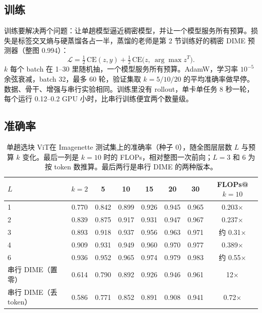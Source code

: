 \documentclass[11pt,a4paper,UTF8,fontset=none]{ctexart}
\newcommand{\dense}{整图一次前向}
\newcommand{\tokdrop}{丢 token}
\newcommand{\onepass}{单趟选块 ViT}
\begin{document}
\subsection{训练}

训练要解决两个问题：让单趟模型逼近稠密模型，并让一个模型服务所有预算。损失是标签交叉熵与硬蒸馏各占一半，蒸馏的老师是第 2 节训练好的稠密 DIME 预测器（整图 0.994）：
\begin{equation}
\mathcal{L} = \tfrac12\,\mathrm{CE}(z, y) + \tfrac12\,\mathrm{CE}\big(z,\ \arg\max z^{T}\big).
\end{equation}
$k$ 每个 batch 在 1--30 里随机抽，一个模型服务所有预算。AdamW，学习率 $10^{-5}$ 余弦衰减，batch 32，最多 60 轮，验证集取 $k=5/10/20$ 的平均准确率做早停。数据、骨干、增强与串行实验相同。训练里没有 rollout，单卡单任务 8 秒一轮，每个运行 0.12--0.2 GPU 小时，比串行训练便宜两个数量级。

\subsection{准确率}

\begin{table}[H]
\centering
\caption{\onepass{}在 Imagenette 测试集上的准确率（种子 0），随全图层层数 $L$ 与预算 $k$ 变化。最后一列是 $k=10$ 时的 FLOPs，相对\dense；$L=3$ 和 6 为按 token 数推算。最后两行是串行 DIME 的两种版本。}
\label{tab:onepass-acc}
\footnotesize
\setlength{\tabcolsep}{5pt}
\begin{tabular}{lccccccc}
\toprule
$L$ & $k=2$ & 5 & 10 & 15 & 20 & 30 & FLOPs@$k=10$ \\
\midrule
1 & 0.770 & 0.842 & 0.899 & 0.926 & 0.945 & 0.965 & 0.203$\times$ \\
2 & 0.839 & 0.875 & 0.917 & 0.931 & 0.947 & 0.967 & 0.237$\times$ \\
3 & 0.893 & 0.918 & 0.937 & 0.956 & 0.963 & 0.971 & 约 0.31$\times$ \\
4 & 0.909 & 0.931 & 0.949 & 0.960 & 0.970 & 0.977 & 0.389$\times$ \\
6 & 0.936 & 0.952 & 0.965 & 0.974 & 0.979 & 0.983 & 约 0.55$\times$ \\
\midrule
串行 DIME（置零） & 0.614 & 0.790 & 0.892 & 0.926 & 0.946 & 0.961 & 12$\times$ \\
串行 DIME（\tokdrop） & 0.586 & 0.771 & 0.852 & 0.891 & 0.908 & 0.941 & 0.72$\times$ \\
\bottomrule
\end{tabular}
\end{table}
\end{document}
